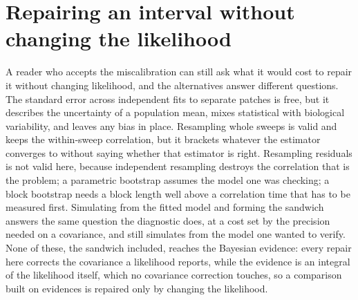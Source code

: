 \begin{appendixbox}
\label{app:repairs}
\section*{Repairing an interval without changing the likelihood}

A reader who accepts the miscalibration can still ask what it would cost to repair it without
changing likelihood, and the alternatives answer different questions. The standard error across
independent fits to separate patches is free, but it describes the uncertainty of a population mean,
mixes statistical with biological variability, and leaves any bias in place. Resampling whole sweeps
is valid and keeps the within-sweep correlation, but it brackets whatever the estimator converges to
without saying whether that estimator is right. Resampling residuals is not valid here, because
independent resampling destroys the correlation that is the problem; a parametric bootstrap assumes
the model one was checking; a block bootstrap needs a block length well above a correlation time that
has to be measured first. Simulating from the fitted model and forming the sandwich answers the same
question the diagnostic does, at a cost set by the precision needed on a covariance, and still
simulates from the model one wanted to verify. None of these, the sandwich included, reaches the
Bayesian evidence: every repair here corrects the covariance a likelihood reports, while the
evidence is an integral of the likelihood itself, which no covariance correction touches, so a
comparison built on evidences is repaired only by changing the likelihood.

\end{appendixbox}
